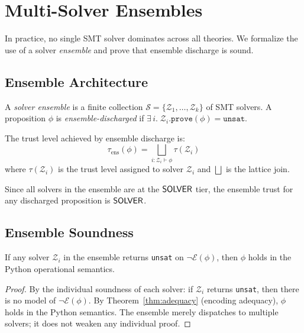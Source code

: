 \documentclass[11pt]{article}
\newcommand{\smtenc}{\mathcal{E}}
\newcommand{\EnsembleTrust}{\tau_{\mathrm{ens}}}
\begin{document}
\section{Multi-Solver Ensembles}\label{sec:multi-solver}

In practice, no single SMT solver dominates across all theories.
We formalize the use of a solver \emph{ensemble} and prove that
ensemble discharge is sound.

\subsection{Ensemble Architecture}

\begin{definition}\label{def:solver-ensemble}
A \emph{solver ensemble} is a finite collection
$\mathcal{S} = \{\mathcal{Z}_1, \ldots, \mathcal{Z}_k\}$ of
SMT solvers.  A proposition $\phi$ is \emph{ensemble-discharged} if
$\exists\, i.\; \mathcal{Z}_i.\texttt{prove}(\phi) = \texttt{unsat}$.
\end{definition}

\begin{definition}\label{def:ensemble-trust}
The trust level achieved by ensemble discharge is:
\[
  \EnsembleTrust(\phi) = \bigsqcup_{i : \mathcal{Z}_i \vdash \phi}
  \tau(\mathcal{Z}_i)
\]
where $\tau(\mathcal{Z}_i)$ is the trust level assigned to solver
$\mathcal{Z}_i$ and $\bigsqcup$ is the lattice join.
\end{definition}

Since all solvers in the ensemble are at the $\mathsf{SOLVER}$ tier, the
ensemble trust for any discharged proposition is $\mathsf{SOLVER}$.

\subsection{Ensemble Soundness}

\begin{theorem}\label{thm:ensemble-soundness}
If any solver $\mathcal{Z}_i$ in the ensemble returns \texttt{unsat}
on $\neg\smtenc(\phi)$, then $\phi$ holds in the Python operational
semantics.
\end{theorem}

\begin{proof}
By the individual soundness of each solver: if $\mathcal{Z}_i$ returns
\texttt{unsat}, then there is no model of $\neg\smtenc(\phi)$.  By
Theorem~\ref{thm:adequacy} (encoding adequacy), $\phi$ holds in the
Python semantics.  The ensemble merely dispatches to multiple solvers;
it does not weaken any individual proof.
\end{proof}
\end{document}

